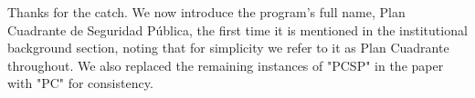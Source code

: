

Thanks for the catch. We now introduce the program's full name, Plan Cuadrante de Seguridad P\'ublica, the first time it is mentioned in the institutional background section, noting that for simplicity we refer to it as Plan Cuadrante throughout. We also replaced the remaining instances of "PCSP" in the paper with "PC" for consistency.





